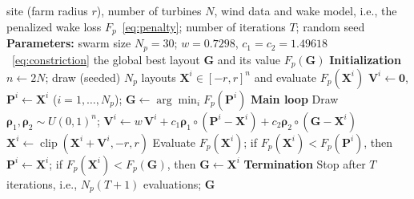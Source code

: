 \begin{algorithm}[!t]
\caption{PSO for the WFLOP as implemented (complete procedure; $N_p(T+1)$ evaluations of $F_p$).}
\label{alg:pso}
\small
\begin{algorithmic}[1]
\Require site (farm radius $r$), number of turbines $N$, wind data and wake model, i.e., the penalized wake loss $F_p$~\eqref{eq:penalty}; number of iterations $T$; random seed
\Statex \textbf{Parameters:} swarm size $N_p=30$; $w=0.7298$, $c_1=c_2=1.49618$~\eqref{eq:constriction}
\Ensure the global best layout $\mathbf G$ and its value $F_p(\mathbf G)$
\Statex \textbf{Initialization}
\State $n\gets2N$; draw (seeded) $N_p$ layouts $\mathbf X^i\in[-r,r]^n$ and evaluate $F_p(\mathbf X^i)$ 
\State $\mathbf V^i\gets\mathbf 0$, $\mathbf P^i\gets\mathbf X^i$ ($i=1,\ldots,N_p$); $\mathbf G\gets\arg\min_i F_p(\mathbf P^i)$
\Statex \textbf{Main loop}
        \State Draw $\boldsymbol\rho_1,\boldsymbol\rho_2\sim U(0,1)^n$; $\mathbf V^i\gets w\,\mathbf V^i+c_1\boldsymbol\rho_1\circ(\mathbf P^i-\mathbf X^i)+c_2\boldsymbol\rho_2\circ(\mathbf G-\mathbf X^i)$ \Comment{\eqref{eq:pso-v}}
        \State $\mathbf X^i\gets\operatorname{clip}(\mathbf X^i+\mathbf V^i,-r,r)$ 
        \State Evaluate $F_p(\mathbf X^i)$; if $F_p(\mathbf X^i)<F_p(\mathbf P^i)$, then $\mathbf P^i\gets\mathbf X^i$; if $F_p(\mathbf X^i)<F_p(\mathbf G)$, then $\mathbf G\gets\mathbf X^i$ 
    \EndFor
\EndFor
\Statex \textbf{Termination}
\State Stop after $T$ iterations, i.e., $N_p(T+1)$ evaluations; \Return $\mathbf G$
\end{algorithmic}
\end{algorithm}

